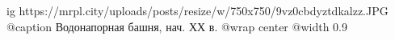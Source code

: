  
 
 
 
 

\ifcmt
  ig https://mrpl.city/uploads/posts/resize/w/750x750/9vz0cbdyztdkalzz.JPG
	@caption Водонапорная башня, нач. ХХ в.
  @wrap center
  @width 0.9
\fi
